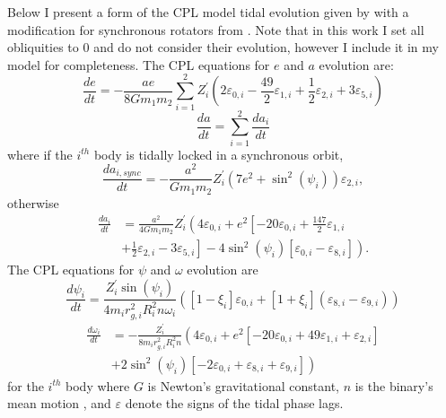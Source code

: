 Below I present a form of the CPL model tidal evolution given by \citet{Heller2011} with a modification for synchronous rotators from \citet{FerrazMello2008}.  Note that in this work I set all obliquities to 0 and do not consider their evolution, however I include it in my model for completeness.  The CPL equations for $e$ and $a$ evolution are:
\begin{equation} \label{STEEP:eqn:cpl_dedt}
\frac{de}{dt} = -\frac{ae}{8 G m_1 m_2} \sum_{i=1}^2 Z_i^{'} \left( 2 \varepsilon_{0,i} - \frac{49}{2} \varepsilon_{1,i} + \frac{1}{2} \varepsilon_{2,i} + 3 \varepsilon_{5,i} \right)
\end{equation}
\begin{equation} \label{STEEP:eqn:cpl_dadt_net}
\frac{da}{dt} = \sum_{i=1}^2 \frac{da_i}{dt}
\end{equation}
where if the $i^{th}$ body is tidally locked in a synchronous orbit,
\begin{equation} \label{STEEP:eqn:cpl_dadt_locked}
\frac{da_{i,sync}}{dt} = -\frac{a^2}{G m_1 m_2} Z_i^{'} \left( 7 e^2 + \sin^2 (\psi_i) \right) \varepsilon_{2,i},
\end{equation}
otherwise
\begin{equation}
\begin{split}
\frac{da_i}{dt} & = \frac{a^2}{4 G m_1 m_2} Z_i^{'} \left( 4 \varepsilon_{0,i} + e^2 \left[ -20 \varepsilon_{0,i} + \frac{147}{2} \varepsilon_{1,i} \right. \right. \\
&  + \left. \left. \frac{1}{2} \varepsilon_{2,i} - 3 \varepsilon_{5,i} \right] - 4 \sin^2 (\psi_i) \left[ \varepsilon_{0,i} - \varepsilon_{8,i} \right] \right).
\end{split}
\end{equation}
The CPL equations for $\psi$ and $\omega$ evolution are
\begin{equation} \label{STEEP:eqn:cpl_dpsidt}
\frac{d\psi_i}{dt} = \frac{Z_i^{'} \sin(\psi_i)}{4 m_i r_{g,i}^2 R_i^2 n \omega_i} \left( [1-\xi_i] \varepsilon_{0,i} + [1+\xi_i](\varepsilon_{8,i} - \varepsilon_{9,i}) \right)
\end{equation}
\begin{equation} \label{STEEP:eqn:cpl_dwdt}
\begin{split}
\frac{d\omega_i}{dt}& = -\frac{Z_i^{'}}{8m_i r_{g,i}^2 R_i^2 n} \left(4 \varepsilon_{0,i} + e^2\left[-20\varepsilon_{0,i} + 49\varepsilon_{1,i} + \varepsilon_{2,i} \right] \right. \\
& \left. + 2 \sin^2(\psi_i) \left[ -2 \varepsilon_{0,i} + \varepsilon_{8,i} + \varepsilon_{9,i} \right] \right)
\end{split}
\end{equation}
for the $i^{th}$ body where $G$ is Newton's gravitational constant, $n$ is the binary's mean motion , and $\varepsilon$ denote the signs of the tidal phase lags.


